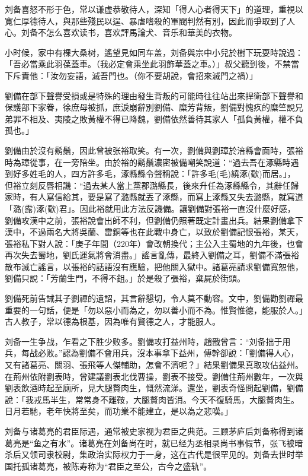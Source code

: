 刘备喜怒不形于色，常以谦虚恭敬待人，深知「得人心者得天下」的道理，重視以寬仁厚德待人，與那些殘民以逞、暴虐嗜殺的軍閥判然有別，因此而爭取到了人心。刘备不怎么喜欢读书，喜欢評馬論犬、音乐和華美的衣物。

小时候，家中有棵大桑树，遙望見如同车盖，刘备與宗中小兒於樹下玩耍時說過：「吾必當乘此羽葆蓋車。（我必定會乘坐此羽飾華蓋之車。）」叔父聽到後，不禁當下斥責他：「汝勿妄語，滅吾門也。（你不要胡說，會招來滅門之禍）」

劉備在部下聲譽受損或是特殊的理由發生背叛的可能時往往站出來捍衛部下聲譽和保護部下家眷，徐庶母被抓，庶淚崩辭別劉備、糜芳背叛，劉備對愧疚的糜竺說兄弟罪不相及、夷陵之敗黃權不得已降魏，劉備依然善待其家人「孤負黃權，權不負孤也。」

劉備由於沒有鬍鬚，因此曾被张裕取笑。有一次，劉備與劉璋於涪縣會面時，張裕時為璋從事，在一旁陪坐。由於裕的鬍鬚濃密被備嘲笑說道：“過去吾在涿縣時遇到好多姓毛的人，四方許多毛，涿縣縣令聲稱說：「許多毛(毛)繞涿(歜)而居。」，但裕立刻反唇相譏：“過去某人當上黨郡潞縣長，後來升任為涿縣縣令，其辭任歸家時，有人寫信給其，要是寫了潞縣就丟了涿縣，而寫上涿縣又失去潞縣，就寫道「潞(露)涿(歜)君」。因此裕就用此方法反譏備。讓劉備對張裕一直沒什麼好感，劉備攻漢中之前，張裕說會出師不利，但劉備仍照著既定計畫出兵。結果劉備拿下漢中，不過兩名大將吳蘭、雷銅等也在此戰中身亡，以致於劉備記恨張裕，某天，張裕私下對人說：「庚子年間（220年）會改朝換代；主公入主蜀地的九年後，也會再次失去蜀地，劉氏運氣將會消盡。」謠言亂傳，最終入劉備之耳，劉備不滿張裕散布滅亡謠言，以張裕的話語沒有應驗，把他關入獄中。諸葛亮請求劉備寬恕他，劉備只說：「芳蘭生門，不得不鉏。」於是殺了張裕，棄屍於街頭。

劉備死前告誡其子劉禪的遺詔，其言辭懇切，令人莫不動容。文中，劉備勸劉禪最重要的一句話，便是「勿以惡小而為之，勿以善小而不為。惟賢惟德，能服於人。」古人教子，常以德為根基，因為唯有賢德之人，才能服人。

刘备一生争战，乍看之下胜少败多。劉備攻打益州時，趙戩曾言：“刘备拙于用兵，每战必败。”認為劉備不會用兵，沒本事拿下益州，傅幹卻說：「劉備得人心，又有諸葛亮、關羽、張飛等人傑輔助，怎會不濟呢？」結果劉備果真取攻佔益州。在荊州依附劉表時，曾建議劉表北伐曹操，劉表不接受。劉備住荊州數年，一次與劉表飲酒時起至廁所，見大腿贅肉生，慨然流涕。還坐，劉表奇怪問起劉備，劉備說：「我戎馬半生，常常身不離鞍，大腿贅肉皆消。今天不復騎馬，大腿贅肉生。日月若馳，老年快將至矣，而功業不能建立，是以為之悲嘆。」

刘备与诸葛亮的君臣际遇，通常被史家视为君臣之典范。三顾茅庐后刘备称得到诸葛亮是“鱼之有水”。诸葛亮在刘备尚在时，就已经为丞相录尚书事假节，张飞被暗杀后又领司隶校尉，集政治实际权力于一身，这在古代是很罕见的。刘备去世时举国托孤诸葛亮，被陈寿称为“君臣之至公，古今之盛轨”。

